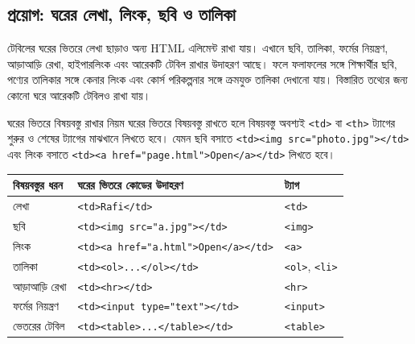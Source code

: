 
\subsection{প্রয়োগ: ঘরের লেখা, লিংক, ছবি ও তালিকা}

টেবিলের ঘরের ভিতরে লেখা ছাড়াও অন্য HTML এলিমেন্ট রাখা যায়। এখানে ছবি, তালিকা, ফর্মের নিয়ন্ত্রণ, আড়াআড়ি রেখা, হাইপারলিংক এবং আরেকটি টেবিল রাখার উদাহরণ আছে। ফলে ফলাফলের সঙ্গে শিক্ষার্থীর ছবি, পণ্যের তালিকার সঙ্গে কেনার লিংক এবং কোর্স পরিকল্পনার সঙ্গে ক্রমযুক্ত তালিকা দেখানো যায়। বিস্তারিত তথ্যের জন্য কোনো ঘরে আরেকটি টেবিলও রাখা যায়।

\begin{keypointbox}{ঘরের ভিতরে বিষয়বস্তু রাখার নিয়ম}
ঘরের ভিতরে বিষয়বস্তু রাখতে হলে বিষয়বস্তু অবশ্যই \texttt{<td>} বা \texttt{<th>} ট্যাগের শুরুর ও শেষের ট্যাগের মাঝখানে লিখতে হবে। যেমন ছবি বসাতে \texttt{<td><img src="photo.jpg"></td>} এবং লিংক বসাতে \texttt{<td><a href="page.html">Open</a></td>} লিখতে হবে।
\end{keypointbox}

\begin{center}
\begin{tabular}{|p{}|p{}|p{}|}
\hline
\textbf{বিষয়বস্তুর ধরন} & \textbf{ঘরের ভিতরে কোডের উদাহরণ} & \textbf{ট্যাগ} \\
\hline
লেখা & \texttt{<td>Rafi</td>} & \texttt{<td>} \\
\hline
ছবি & \texttt{<td><img src="a.jpg"></td>} & \texttt{<img>} \\
\hline
লিংক & \texttt{<td><a href="a.html">Open</a></td>} & \texttt{<a>} \\
\hline
তালিকা & \texttt{<td><ol>...</ol></td>} & \texttt{<ol>}, \texttt{<li>} \\
\hline
আড়াআড়ি রেখা & \texttt{<td><hr></td>} & \texttt{<hr>} \\
\hline
ফর্মের নিয়ন্ত্রণ & \texttt{<td><input type="text"></td>} & \texttt{<input>} \\
\hline
ভেতরের টেবিল & \texttt{<td><table>...</table></td>} & \texttt{<table>} \\
\hline
\end{tabular}
\end{center}

